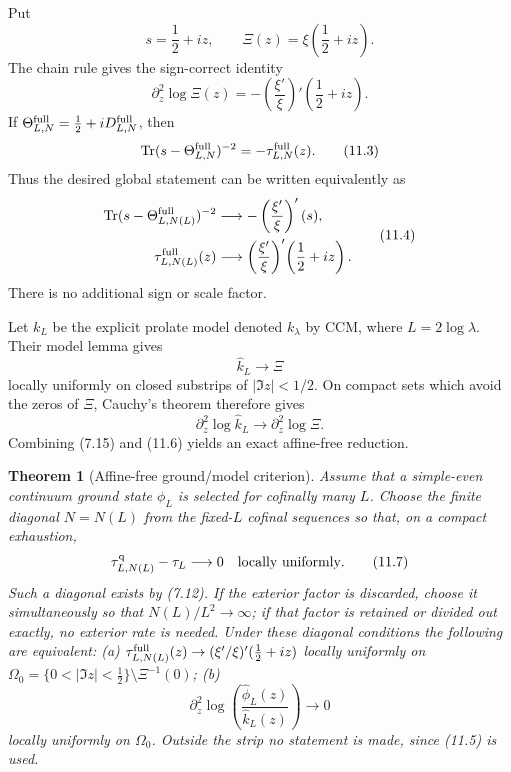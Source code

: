 \documentclass[11pt]{amsart}
\newtheorem{theorem}{Theorem}[section]
\theoremstyle{definition}
\theoremstyle{remark}
\newcommand{\Tr}{\operatorname{Tr}}
\newcommand{\XiR}{\Xi}
\begin{document}
Put
\[
 s=\frac12+iz,
 \qquad \XiR(z)=\xi\!\left(\frac12+iz\right).
\tag{11.1}
\]
The chain rule gives the sign-correct identity
\[
\boxed{
 \partial_z^2\log\XiR(z)
 =-\left(\frac{\xi'}{\xi}\right)'\!\left(\frac12+iz\right).}
\tag{11.2}
\]
If \(\Theta_{L,N}^{\rm full}=\frac12+iD_{L,N}^{\rm full}\), then
\[
 \Tr(s-\Theta_{L,N}^{\rm full})^{-2}
 =-\tau_{L,N}^{\rm full}(z).
\tag{11.3}
\]
Thus the desired global statement can be written equivalently as
\[
\begin{aligned}
 \Tr(s-\Theta_{L,N(L)}^{\rm full})^{-2}
 &\longrightarrow-\left(\frac{\xi'}{\xi}\right)'(s),\\
 \tau_{L,N(L)}^{\rm full}(z)
 &\longrightarrow
 \left(\frac{\xi'}{\xi}\right)'\!\left(\frac12+iz\right).
\end{aligned}
\tag{11.4}
\]
There is no additional sign or scale factor.

Let \(k_L\) be the explicit prolate model denoted \(k_\lambda\) by CCM,
where \(L=2\log\lambda\).  Their model lemma \cite[Lemma~7.3]{CCM} gives
\[
 \widehat k_L\longrightarrow\XiR
\tag{11.5}
\]
locally uniformly on closed substrips of \(|\Im z|<1/2\).  On compact sets
which avoid the zeros of \(\XiR\), Cauchy's theorem therefore gives
\[
 \partial_z^2\log\widehat k_L
 \longrightarrow\partial_z^2\log\XiR.
\tag{11.6}
\]
Combining (7.15) and (11.6) yields an exact affine-free reduction.

\begin{theorem}[Affine-free ground/model criterion]
Assume that a simple-even continuum ground state \(\phi_L\) is selected for
cofinally many \(L\).  Choose the finite diagonal \(N=N(L)\) from the
fixed-\(L\) cofinal sequences so that, on a compact exhaustion,
\[
 \tau_{L,N(L)}^{\rm q}-\tau_L\longrightarrow0
 \quad\text{locally uniformly}.
\tag{11.7}
\]
Such a diagonal exists by (7.12).  If the exterior factor is discarded,
choose it simultaneously so that \(N(L)/L^2\to\infty\); if that factor is
retained or divided out exactly, no exterior rate is needed.  Under these
diagonal conditions the following are equivalent:
\textup{(a)} \(\tau^{\rm full}_{L,N(L)}(z)\to(\xi'/\xi)'(\tfrac12+iz)\)
locally uniformly on
\(\Omega_0=\{0<|\Im z|<\tfrac12\}\setminus\XiR^{-1}(0)\);
\textup{(b)}
\[
\boxed{
 \partial_z^2\log
 \left(\frac{\widehat\phi_L(z)}{\widehat k_L(z)}\right)
 \longrightarrow0}
\tag{11.8}
\]
locally uniformly on \(\Omega_0\).  Outside the strip no statement is
made, since \textup{(11.5)} is used.
\end{theorem}
\end{document}
